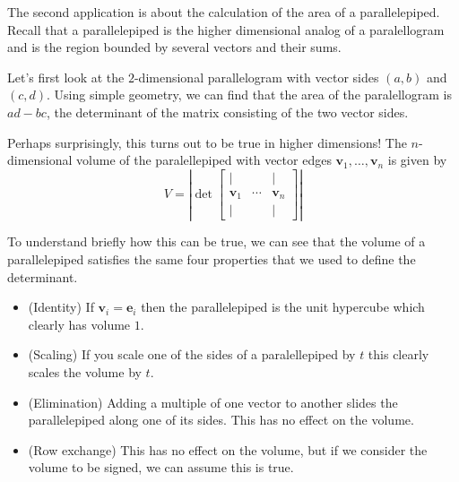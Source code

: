 \documentclass[11pt,oneside]{amsbook}
\theoremstyle{definition}
\theoremstyle{plain}
\theoremstyle{definition}
\theoremstyle{remark}
\numberwithin{equation}{section}
\numberwithin{figure}{section}
\begin{document}
The second application is about the calculation of the area of a parallelepiped. Recall that a parallelepiped is the higher dimensional analog of a paralellogram and is the region bounded by several vectors and their sums.

Let's first look at the $2$-dimensional parallelogram with vector sides $(a,b)$ and $(c,d)$. Using simple geometry, we can find that the area of the paralellogram is $ad-bc$, the determinant of the matrix consisting of the two vector sides.
\begin{center}
\end{center}

Perhaps surprisingly, this turns out to be true in higher dimensions! The $n$-dimensional volume of the paralellepiped with vector edges $\mathbf{v}_1,\ldots,\mathbf{v}_n$ is given by
\[V=\left|\det\begin{bmatrix}
      |&&|\\
      \mathbf{v}_1&\cdots&\mathbf{v}_n\\
      |&&|
    \end{bmatrix}\right|
\]

To understand briefly how this can be true, we can see that the volume of a parallelepiped satisfies the same four properties that we used to define the determinant.
\begin{itemize}
  \item (Identity) If $\mathbf{v}_i=\mathbf{e}_i$ then the parallelepiped is the unit hypercube which clearly has volume $1$.
  \item (Scaling) If you scale one of the sides of a paralellepiped by $t$ this clearly scales the volume by $t$.
  \item (Elimination) Adding a multiple of one vector to another slides the parallelepiped along one of its sides. This has no effect on the volume.
  \item (Row exchange) This has no effect on the volume, but if we consider the volume to be signed, we can assume this is true.
\end{itemize}
\end{document}
